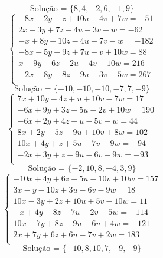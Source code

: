 \documentclass[12pt,oneside,a4paper]{article}
\begin{document}
\begin{equation*}
\text{Solução = }\{8,4,-2,6,-1,9\}
\end{equation*}
\vspace{\baselineskip}
\begin{equation*}
\begin{cases}
-8x-2y-z+10u-4v+7w=-51 \\
2x-3y+7z-4u-3v+w=-62 \\
-x+8y+10z-4u-7v-w=-182 \\
-8x-5y-9z+7u+v+10w=88 \\
x-9y-6z-2u-4v-10w=216 \\
-2x-8y-8z-9u-3v-5w=267 \\
\end{cases}
\end{equation*}
\begin{equation*}
\text{Solução = }\{-10,-10,-10,-7,7,-9\}
\end{equation*}
\vspace{\baselineskip}
\begin{equation*}
\begin{cases}
7x+10y-4z+u+10v-7w=17 \\
-6x+9y+3z+5u-2v+10w=190 \\
-6x+2y+4z-u-5v-w=44 \\
8x+2y-5z-9u+10v+8w=102 \\
10x+4y+z+5u-7v-9w=-94 \\
-2x+3y+z+9u-6v-9w=-93 \\
\end{cases}
\end{equation*}
\begin{equation*}
\text{Solução = }\{-2,10,8,-4,3,9\}
\end{equation*}
\vspace{\baselineskip}
\begin{equation*}
\begin{cases}
-10x+4y+6z-5u-10v+10w=157 \\
3x-y-10z+3u-6v-9w=18 \\
10x-3y+2z+10u+5v-10w=11 \\
-x+4y-8z-7u-2v+5w=-114 \\
10x-7y+8z-9u-6v+4w=-121 \\
2x+7y+6z+6u-7v+2w=183 \\
\end{cases}
\end{equation*}
\begin{equation*}
\text{Solução = }\{-10,8,10,7,-9,-9\}
\end{equation*}
\end{document}
